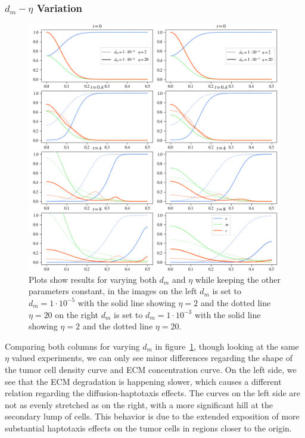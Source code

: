 \subsubsection*{$d_m - \eta$ Variation}
\begin{figure}[h!]
 \centering
 \includegraphics[width=\textwidth]{resources/images/dm_eta_variation.png}
 \caption{Plots show results for varying both $d_m$ and $\eta$ while keeping the other parameters constant, in the images on the left $d_m$ is set to $d_m=1\cdot 10^{-5}$ with the solid line showing $\eta = 2$ and the dotted line $\eta=20$ on the right $d_m$ is set to $d_m=1\cdot 10^{-3}$ with the solid line showing $\eta = 2$ and the dotted line $\eta=20$.}
 \label{fig:dm_eta_variation}
\end{figure}

Comparing both columns for varying $d_m$ in figure~\ref{fig:dm_eta_variation}, though looking at the same $\eta$ valued experiments, we can only see minor differences regarding the shape of the tumor cell density curve and ECM concentration curve. On the left side, we see that the ECM degradation is happening slower, which causes a different relation regarding the diffusion-haptotaxis effects. The curves on the left side are not as evenly stretched as on the right, with a more significant hill at the secondary lump of cells. This behavior is due to the extended exposition of more substantial haptotaxis effects on the tumor cells in regions closer to the origin. 

